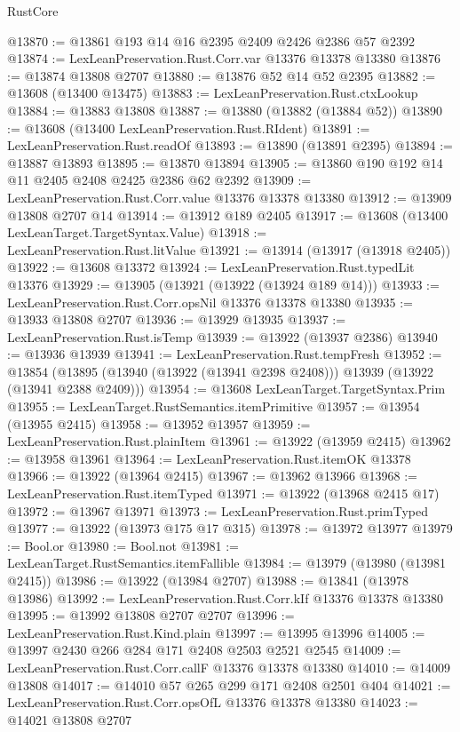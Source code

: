 \begin{lexlean}{RustCore}
\begin{coremodule}
@13870 := @13861 @193 @14 @16 @2395 @2409 @2426 @2386 @57 @2392
@13874 := LexLeanPreservation.Rust.Corr.var @13376 @13378 @13380
@13876 := @13874 @13808 @2707
@13880 := @13876 @52 @14 @52 @2395
@13882 := @13608 (@13400 @13475)
@13883 := LexLeanPreservation.Rust.ctxLookup
@13884 := @13883 @13808
@13887 := @13880 (@13882 (@13884 @52))
@13890 := @13608 (@13400 LexLeanPreservation.Rust.RIdent)
@13891 := LexLeanPreservation.Rust.readOf
@13893 := @13890 (@13891 @2395)
@13894 := @13887 @13893
@13895 := @13870 @13894
@13905 := @13860 @190 @192 @14 @11 @2405 @2408 @2425 @2386 @62 @2392
@13909 := LexLeanPreservation.Rust.Corr.value @13376 @13378 @13380
@13912 := @13909 @13808 @2707 @14
@13914 := @13912 @189 @2405
@13917 := @13608 (@13400 LexLeanTarget.TargetSyntax.Value)
@13918 := LexLeanPreservation.Rust.litValue
@13921 := @13914 (@13917 (@13918 @2405))
@13922 := @13608 @13372
@13924 := LexLeanPreservation.Rust.typedLit @13376
@13929 := @13905 (@13921 (@13922 (@13924 @189 @14)))
@13933 := LexLeanPreservation.Rust.Corr.opsNil @13376 @13378 @13380
@13935 := @13933 @13808 @2707
@13936 := @13929 @13935
@13937 := LexLeanPreservation.Rust.isTemp
@13939 := @13922 (@13937 @2386)
@13940 := @13936 @13939
@13941 := LexLeanPreservation.Rust.tempFresh
@13952 := @13854
    (@13895 (@13940 (@13922 (@13941 @2398 @2408))) @13939 (@13922 (@13941 @2388 @2409)))
@13954 := @13608 LexLeanTarget.TargetSyntax.Prim
@13955 := LexLeanTarget.RustSemantics.itemPrimitive
@13957 := @13954 (@13955 @2415)
@13958 := @13952 @13957
@13959 := LexLeanPreservation.Rust.plainItem
@13961 := @13922 (@13959 @2415)
@13962 := @13958 @13961
@13964 := LexLeanPreservation.Rust.itemOK @13378
@13966 := @13922 (@13964 @2415)
@13967 := @13962 @13966
@13968 := LexLeanPreservation.Rust.itemTyped
@13971 := @13922 (@13968 @2415 @17)
@13972 := @13967 @13971
@13973 := LexLeanPreservation.Rust.primTyped
@13977 := @13922 (@13973 @175 @17 @315)
@13978 := @13972 @13977
@13979 := Bool.or
@13980 := Bool.not
@13981 := LexLeanTarget.RustSemantics.itemFallible
@13984 := @13979 (@13980 (@13981 @2415))
@13986 := @13922 (@13984 @2707)
@13988 := @13841 (@13978 @13986)
@13992 := LexLeanPreservation.Rust.Corr.kIf @13376 @13378 @13380
@13995 := @13992 @13808 @2707 @2707
@13996 := LexLeanPreservation.Rust.Kind.plain
@13997 := @13995 @13996
@14005 := @13997 @2430 @266 @284 @171 @2408 @2503 @2521 @2545
@14009 := LexLeanPreservation.Rust.Corr.callF @13376 @13378 @13380
@14010 := @14009 @13808
@14017 := @14010 @57 @265 @299 @171 @2408 @2501 @404
@14021 := LexLeanPreservation.Rust.Corr.opsOfL @13376 @13378 @13380
@14023 := @14021 @13808 @2707

\end{coremodule}
\end{lexlean}
